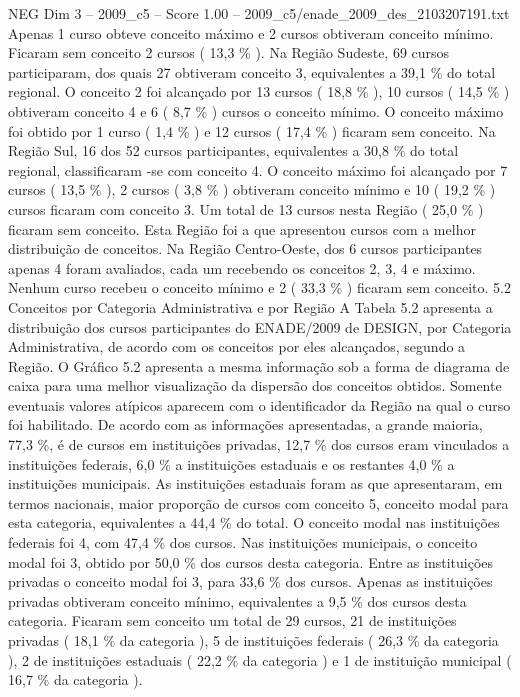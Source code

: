 \begin{textsample}{NEG Dim 3 – 2009\_c5 – Score 1.00 – 2009\_c5/enade\_2009\_des\_2103207191.txt}
Apenas 1 curso obteve conceito máximo e 2 cursos obtiveram conceito mínimo.
Ficaram sem conceito 2 cursos ( 13,3 \% ).
Na Região Sudeste, 69 cursos participaram, dos quais 27 obtiveram conceito 3, equivalentes a 39,1 \% do total regional.
O conceito 2 foi alcançado por 13 cursos ( 18,8 \% ), 10 cursos ( 14,5 \% ) obtiveram conceito 4 e 6 ( 8,7 \% ) cursos o conceito mínimo.
O conceito máximo foi obtido por 1 curso ( 1,4 \% ) e 12 cursos ( 17,4 \% ) ficaram sem conceito.
Na Região Sul, 16 dos 52 cursos participantes, equivalentes a 30,8 \% do total regional, classificaram -se com conceito 4.
O conceito máximo foi alcançado por 7 cursos ( 13,5 \% ), 2 cursos ( 3,8 \% ) obtiveram conceito mínimo e 10 ( 19,2 \% ) cursos ficaram com conceito 3.
Um total de 13 cursos nesta Região ( 25,0 \% ) ficaram sem conceito.
Esta Região foi a que apresentou cursos com a melhor distribuição de conceitos.
Na Região Centro-Oeste, dos 6 cursos participantes apenas 4 foram avaliados, cada um recebendo os conceitos 2, 3, 4 e máximo.
Nenhum curso recebeu o conceito mínimo e 2 ( 33,3 \% ) ficaram sem conceito. 5.2 Conceitos por Categoria Administrativa e por Região A Tabela 5.2 apresenta a distribuição dos cursos participantes do ENADE/2009 de DESIGN, por Categoria Administrativa, de acordo com os conceitos por eles alcançados, segundo a Região.
O Gráfico 5.2 apresenta a mesma informação sob a forma de diagrama de caixa para uma melhor visualização da dispersão dos conceitos obtidos.
Somente eventuais valores atípicos aparecem com o identificador da Região na qual o curso foi habilitado.
De acordo com as informações apresentadas, a grande maioria, 77,3 \%, é de cursos em instituições privadas, 12,7 \% dos cursos eram vinculados a instituições federais, 6,0 \% a instituições estaduais e os restantes 4,0 \% a instituições municipais.
As instituições estaduais foram as que apresentaram, em termos nacionais, maior proporção de cursos com conceito 5, conceito modal para esta categoria, equivalentes a 44,4 \% do total.
O conceito modal nas instituições federais foi 4, com 47,4 \% dos cursos.
Nas instituições municipais, o conceito modal foi 3, obtido por 50,0 \% dos cursos desta categoria.
Entre as instituições privadas o conceito modal foi 3, para 33,6 \% dos cursos.
Apenas as instituições privadas obtiveram conceito mínimo, equivalentes a 9,5 \% dos cursos desta categoria.
Ficaram sem conceito um total de 29 cursos, 21 de instituições privadas ( 18,1 \% da categoria ), 5 de instituições federais ( 26,3 \% da categoria ), 2 de instituições estaduais ( 22,2 \% da categoria ) e 1 de instituição municipal ( 16,7 \% da categoria ).

\end{textsample}
